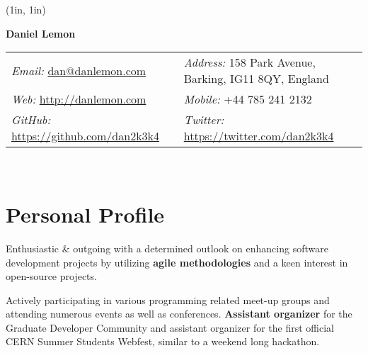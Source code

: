 \documentclass[final,a4paper,notitlepage,10pt]{article}
\makeatletter
\newcommand{\mailto}[1]{\href{mailto:#1}{#1}}
\newcommand{\name}{Daniel Lemon}
\newcommand{\addr}{158 Park Avenue, Barking, IG11 8QY, England}
\newcommand{\phone}{+44 785 241 2132}
\newcommand{\email}{\mailto{dan@danlemon.com}}
\newcommand{\website}{\href{http://danlemon.com}{http://danlemon.com}}
\newcommand{\github}{\href{https://github.com/dan2k3k4}{https://github.com/dan2k3k4}}
\newcommand{\twitter}{\href{https://twitter.com/dan2k3k4}{https://twitter.com/dan2k3k4}}
\makeatother
\begin{document}
\begin{minipage}[t]{\textwidth}
	\begin{minipage}{1in}
	\begin{pspicture}(1in, 1in)
	\end{pspicture}
	\end{minipage}\hspace{0.6cm}%
	\begin{minipage}{0.85\textwidth}
	\textbf{\LARGE \qquad \name }

	\begin{tabular*}{\textwidth}{@{} p{} l}\\
	\textit{Email:} \email\ & \textit{Address:} \addr \\
	\textit{Web:} \website\ & \textit{Mobile:} \phone \\
	\textit{GitHub:} \github\ & \textit{Twitter:} \twitter \\
	\end{tabular*}\\
	
	\end{minipage}
\end{minipage}

\section*{Personal Profile {\hfill\raisebox{.5ex}{\makebox[.65\textwidth]{\hrulefill}}}}
\begin{compactitemize}
\item Enthusiastic \& outgoing with a determined outlook on enhancing software development projects by utilizing \textbf{agile methodologies} and a keen interest in open-source projects.

\item Actively participating in various programming related meet-up groups and attending numerous events as well as conferences. \textbf{Assistant organizer} for the Graduate Developer Community and assistant organizer for the first official CERN Summer Students Webfest, similar to a weekend long hackathon.
\end{compactitemize}
\end{document}

